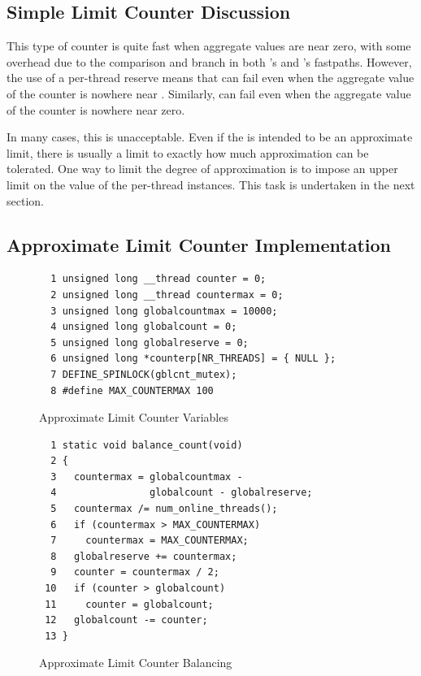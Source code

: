 \subsection{Simple Limit Counter Discussion}
\label{sec:count:Simple Limit Counter Discussion}

This type of counter is quite fast when aggregate values are near zero,
with some overhead due to the comparison and branch in both
's and 's fastpaths.
However, the use of a per-thread  reserve means that
 can fail even when
the aggregate value of the counter is nowhere near .
Similarly,  can fail
even when the aggregate value of the counter is nowhere near zero.

In many cases, this is unacceptable.
Even if the  is intended to be an approximate limit,
there is usually a limit to exactly how much approximation can be tolerated.
One way to limit the degree of approximation is to impose an upper limit
on the value of the per-thread  instances.
This task is undertaken in the next section.

\subsection{Approximate Limit Counter Implementation}
\label{sec:count:Approximate Limit Counter Implementation}

\begin{figure}[tbp]
{ \scriptsize
\begin{verbatim}
  1 unsigned long __thread counter = 0;
  2 unsigned long __thread countermax = 0;
  3 unsigned long globalcountmax = 10000;
  4 unsigned long globalcount = 0;
  5 unsigned long globalreserve = 0;
  6 unsigned long *counterp[NR_THREADS] = { NULL };
  7 DEFINE_SPINLOCK(gblcnt_mutex);
  8 #define MAX_COUNTERMAX 100
\end{verbatim}
}
\caption{Approximate Limit Counter Variables}
\label{fig:count:Approximate Limit Counter Variables}
\end{figure}

\begin{figure}[tbp]
{ \scriptsize
\begin{verbatim}
  1 static void balance_count(void)
  2 {
  3   countermax = globalcountmax -
  4                globalcount - globalreserve;
  5   countermax /= num_online_threads();
  6   if (countermax > MAX_COUNTERMAX)
  7     countermax = MAX_COUNTERMAX;
  8   globalreserve += countermax;
  9   counter = countermax / 2;
 10   if (counter > globalcount)
 11     counter = globalcount;
 12   globalcount -= counter;
 13 }
\end{verbatim}
}
\caption{Approximate Limit Counter Balancing}
\label{fig:count:Approximate Limit Counter Balancing}
\end{figure}


